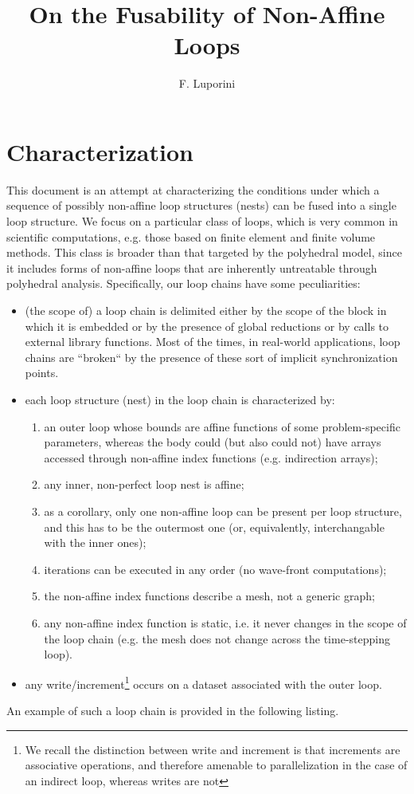 \documentclass[a4paper]{article}
\title{On the Fusability of Non-Affine Loops}
\author{F. Luporini}
\date{}
\begin{document}
\lstset{language=C, breaklines=true}
 
\maketitle

\section{Characterization}
This document is an attempt at characterizing the conditions under which a sequence of possibly non-affine loop structures (nests) can be fused into a single loop structure. We focus on a particular class of loops, which is very common in scientific computations, e.g. those based on finite element and finite volume methods. This class is broader than that targeted by the polyhedral model, since it includes forms of non-affine loops that are inherently untreatable through polyhedral analysis. Specifically, our loop chains have some peculiarities:
\begin{itemize}
\item (the scope of) a loop chain is delimited either by the scope of the block in which it is embedded or by the presence of global reductions or by calls to external library functions. Most of the times, in real-world applications, loop chains are ``broken`` by the presence of these sort of implicit synchronization points.
\item each loop structure (nest) in the loop chain is characterized by:
  \begin{enumerate}
  \item an outer loop whose bounds are affine functions of some problem-specific parameters, whereas the body could (but also could not) have arrays accessed through non-affine index functions (e.g. indirection arrays);
  \item any inner, non-perfect loop nest is affine;
  \item as a corollary, only one non-affine loop can be present per loop structure, and this has to be the outermost one (or, equivalently, interchangable with the inner ones);
  \item iterations can be executed in any order (no wave-front computations);
  \item the non-affine index functions describe a mesh, not a generic graph;
  \item any non-affine index function is static, i.e. it never changes in the scope of the loop chain (e.g. the mesh does not change across the time-stepping loop).
  \end{enumerate}
\item any write/increment\footnote{We recall the distinction between write and increment is that increments are associative operations, and therefore amenable to parallelization in the case of an indirect loop, whereas writes are not} occurs on a dataset associated with the outer loop.
\end{itemize}
An example of such a loop chain is provided in the following listing.
\end{document}
